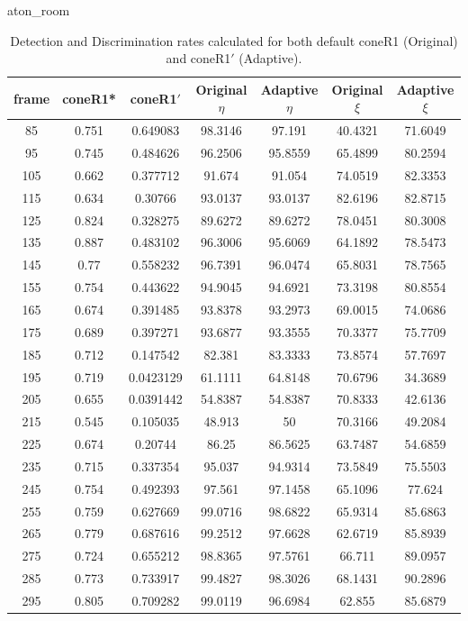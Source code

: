 \begin{appendices}
\begin{table}
\centering
\caption{aton\_room}
\begin{tabular}{ |c|c|c|c|c|c|c| }
\hline
\textbf{frame} &  \textbf{coneR1*} &  \textbf{coneR1$'$} &  \textbf{Original $\eta$} &  \textbf{Adaptive $\eta$} &  \textbf{Original $\xi$} &  \textbf{Adaptive $\xi$} \\
\hline
\hline
85 &  0.751 &  0.649083 &  98.3146 &  97.191 &  40.4321 &  71.6049 \\
\hline
95 &  0.745 &  0.484626 &  96.2506 &  95.8559 &  65.4899 &  80.2594 \\
\hline
105 &  0.662 &  0.377712 &  91.674 &  91.054 &  74.0519 &  82.3353 \\
\hline
115 &  0.634 &  0.30766 &  93.0137 &  93.0137 &  82.6196 &  82.8715 \\
\hline
125 &  0.824 &  0.328275 &  89.6272 &  89.6272 &  78.0451 &  80.3008 \\
\hline
135 &  0.887 &  0.483102 &  96.3006 &  95.6069 &  64.1892 &  78.5473 \\
\hline
145 &  0.77 &  0.558232 &  96.7391 &  96.0474 &  65.8031 &  78.7565 \\
\hline
155 &  0.754 &  0.443622 &  94.9045 &  94.6921 &  73.3198 &  80.8554 \\
\hline
165 &  0.674 &  0.391485 &  93.8378 &  93.2973 &  69.0015 &  74.0686 \\
\hline
175 &  0.689 &  0.397271 &  93.6877 &  93.3555 &  70.3377 &  75.7709 \\
\hline
185 &  0.712 &  0.147542 &  82.381 &  83.3333 &  73.8574 &  57.7697 \\
\hline
195 &  0.719 &  0.0423129 &  61.1111 &  64.8148 &  70.6796 &  34.3689 \\
\hline
205 &  0.655 &  0.0391442 &  54.8387 &  54.8387 &  70.8333 &  42.6136 \\
\hline
215 &  0.545 &  0.105035 &  48.913 &  50 &  70.3166 &  49.2084 \\
\hline
225 &  0.674 &  0.20744 &  86.25 &  86.5625 &  63.7487 &  54.6859 \\
\hline
235 &  0.715 &  0.337354 &  95.037 &  94.9314 &  73.5849 &  75.5503 \\
\hline
245 &  0.754 &  0.492393 &  97.561 &  97.1458 &  65.1096 &  77.624 \\
\hline
255 &  0.759 &  0.627669 &  99.0716 &  98.6822 &  65.9314 &  85.6863 \\
\hline
265 &  0.779 &  0.687616 &  99.2512 &  97.6628 &  62.6719 &  85.8939 \\
\hline
275 &  0.724 &  0.655212 &  98.8365 &  97.5761 &  66.711 &  89.0957 \\
\hline
285 &  0.773 &  0.733917 &  99.4827 &  98.3026 &  68.1431 &  90.2896 \\
\hline
295 &  0.805 &  0.709282 &  99.0119 &  96.6984 &  62.855 &  85.6879 \\
\hline
\end{tabular}
\caption*{Detection and Discrimination rates calculated for both default coneR1 (Original) and coneR1$'$ (Adaptive).}
\end{table}


\end{appendices}
